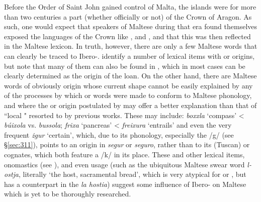 \documentclass[output=paper]{langsci/langscibook}
\begin{document}
Before the Order of Saint John gained control of Malta, the islands were for more than two centuries a part (whether officially or not) of the Crown of Aragon. As such, one would expect that speakers of Maltese during that era found themselves exposed the languages of the Crown like ,  and , and that this was then reflected in the Maltese lexicon. In truth, however, there are only a few Maltese words that can clearly be traced to Ibero-. \cite{catalan2017} identify a number of lexical items with  or  origins, but note that many of them can also be found in , which in most cases can be clearly determined as the origin of the loan. On the other hand, there are Maltese words of obviously  origin whose current shape cannot be easily explained by any of the processes by which  or  words were made to conform to Maltese phonology, and where the  or  origin postulated by \cite{catalan2017} may offer a better explanation than that of ``local " resorted to by previous works. These may include: \textit{boxxla} `compass' <  \textit{búixola} vs.  \textit{bussola}; \textit{frixa} `pancreas' <  \textit{freixura} `entrails' and even the very frequent \textit{żgur} `certain', which, due to its phonology, especially the /g/ (see §\ref{sec:311}), points to an origin in  \textit{segur} or  \textit{seguro}, rather than to its (Tuscan)  or  cognates, which both feature a /k/ in its place. These and other lexical items, onomastics (see \citealt[46]{catalan2017}), and even usage (such as the ubiquitous Maltese swear word \textit{l-ostja}, literally `the host, sacramental bread', which is very atypical for  or , but has a counterpart in the  \textit{la hostia}) suggest some influence of Ibero- on Maltese which is yet to be thoroughly researched.
\end{document}
